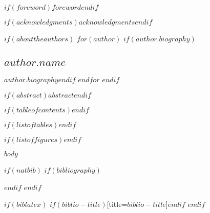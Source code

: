 \documentclass[11pt]{./config/iiir}
\begin{document}
\iicoverpage

$if(foreword)$$foreword$$endif$

$if(acknowledgments)$$acknowledgments$$endif$

$if(abouttheauthors)$
  $for(author)$
  $if(author.biography)$\subsection*{$author.name$}$author.biography$$endif$
  $endfor$
$endif$

$if(abstract)$$abstract$$endif$

$if(tableofcontents)$$endif$

$if(listoftables)$\iilistoftables$endif$

$if(listoffigures)$\iilistoffigures$endif$

\iibody

$body$



$if(natbib)$
$if(bibliography)$

$endif$
$endif$

$if(biblatex)$
\printbibliography$if(biblio-title)$[title=$biblio-title$]$endif$
$endif$
\end{document}
